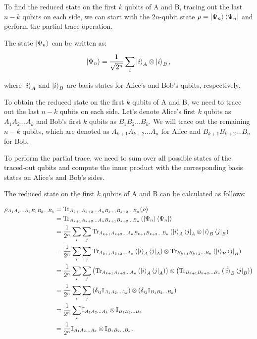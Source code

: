 \documentclass{article}
\begin{document}
To find the reduced state on the first $k$ qubits of A and B, tracing out the last $n - k$ qubits on each side, we can start with the $2n$-qubit state $\rho = \ket{\Psi_n}\bra{\Psi_n}$ and perform the partial trace operation.

The state $\ket{\Psi_n}$ can be written as:

$$\ket{\Psi_n} = \frac{1}{\sqrt{2^n}}\sum_i \ket{i}_A \otimes \ket{i}_B,$$

where $\ket{i}_A$ and $\ket{i}_B$ are basis states for Alice's and Bob's qubits, respectively.

To obtain the reduced state on the first $k$ qubits of A and B, we need to trace out the last $n - k$ qubits on each side. Let's denote Alice's first $k$ qubits as $A_1A_2\ldots A_k$ and Bob's first $k$ qubits as $B_1B_2\ldots B_k$. We will trace out the remaining $n - k$ qubits, which are denoted as $A_{k+1}A_{k+2}\ldots A_n$ for Alice and $B_{k+1}B_{k+2}\ldots B_n$ for Bob.

To perform the partial trace, we need to sum over all possible states of the traced-out qubits and compute the inner product with the corresponding basis states on Alice's and Bob's sides.

The reduced state on the first $k$ qubits of A and B can be calculated as follows:

\begin{align*}
\rho_{A_1A_2\ldots A_kB_1B_2\ldots B_k} &= \mathrm{Tr}_{A_{k+1}A_{k+2}\ldots A_nB_{k+1}B_{k+2}\ldots B_n}(\rho) \\
&= \mathrm{Tr}_{A_{k+1}A_{k+2}\ldots A_nB_{k+1}B_{k+2}\ldots B_n}\left(\ket{\Psi_n}\bra{\Psi_n}\right) \\
&= \frac{1}{2^n}\sum_i \sum_j \mathrm{Tr}_{A_{k+1}A_{k+2}\ldots A_nB_{k+1}B_{k+2}\ldots B_n}\left(\ket{i}_A\bra{j}_A \otimes \ket{i}_B\bra{j}_B\right) \\
&= \frac{1}{2^n}\sum_i \sum_j \mathrm{Tr}_{A_{k+1}A_{k+2}\ldots A_n}\left(\ket{i}_A\bra{j}_A\right) \otimes \mathrm{Tr}_{B_{k+1}B_{k+2}\ldots B_n}\left(\ket{i}_B\bra{j}_B\right) \\
&= \frac{1}{2^n}\sum_i \sum_j \left(\mathrm{Tr}_{A_{k+1}A_{k+2}\ldots A_n}\left(\ket{i}_A\bra{j}_A\right)\right) \otimes \left(\mathrm{Tr}_{B_{k+1}B_{k+2}\ldots B_n}\left(\ket{i}_B\bra{j}_B\right)\right) \\
&= \frac{1}{2^n}\sum_i \sum_j \left(\delta_{ij}\mathbb{I}_{A_1A_2\ldots A_k}\right) \otimes \left(\delta_{ij}\mathbb{I}_{B_1B_2\ldots B_k}\right) \\
&= \frac{1}{2^n}\sum_i \mathbb{I}_{A_1A_2\ldots A_k} \otimes \mathbb{I}_{B_1B_2\ldots B_k} \\
&= \frac{1}{2^n} \mathbb{I}_{A_1A_2\ldots A_k} \otimes \mathbb{I}_{B_1B_2\ldots B_k},
\end{align*}
\end{document}

